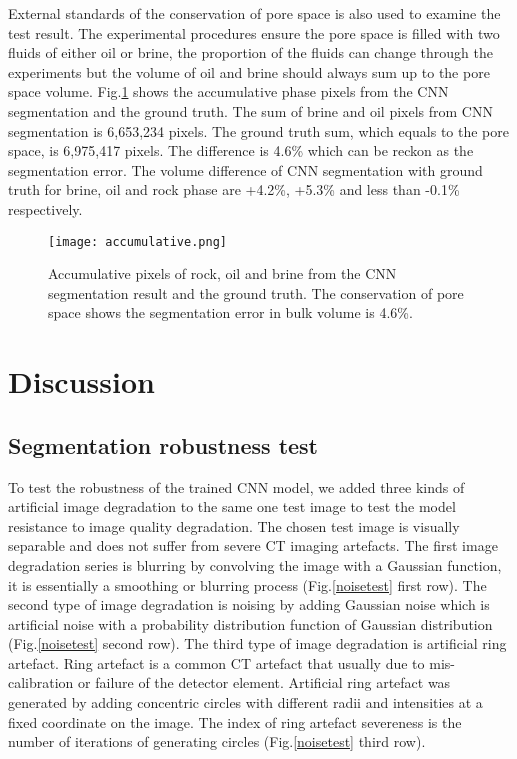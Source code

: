 \documentclass[draft,linenumbers]{agujournal2018}
\begin{document}
External standards of the conservation of pore space is also used to examine the test result. The experimental procedures ensure the pore space is filled with two fluids of either oil or brine, the proportion of the fluids can change through the experiments but the volume of oil and brine should always sum up to the pore space volume. Fig.\ref{accumulative} shows the accumulative phase pixels from the CNN segmentation and the ground truth. The sum of brine and oil pixels from CNN segmentation is 6,653,234 pixels. The ground truth sum, which equals to the pore space, is 6,975,417 pixels. The difference is 4.6\% which can be reckon as the segmentation error. The volume difference of CNN segmentation with ground truth for brine, oil and rock phase are +4.2\%, +5.3\% and less than -0.1\% respectively. 

\begin{figure}[h]
 \centering
 \texttt{[image: accumulative.png]}
 \caption{Accumulative pixels of rock, oil and brine from the CNN segmentation result and the ground truth. The conservation of pore space shows the segmentation error in bulk volume is 4.6\%.}
 \label{accumulative}
 \end{figure}

\section{Discussion}
\subsection{Segmentation robustness test}
To test the robustness of the trained CNN model, we added three kinds of artificial image degradation to the same one test image to test the model resistance to image quality degradation. The chosen test image is visually separable and does not suffer from severe CT imaging artefacts. The first image degradation series is blurring by convolving the image with a Gaussian function, it is essentially a smoothing or blurring process (Fig.\ref{noisetest} first row). The second type of image degradation is noising by adding Gaussian noise which is artificial noise with a probability distribution function of Gaussian distribution (Fig.\ref{noisetest} second row). The third type of image degradation is artificial ring artefact. Ring artefact is a common CT artefact that usually due to mis-calibration or failure of the detector element. Artificial ring artefact was generated by adding concentric circles with different radii and intensities at a fixed coordinate on the image. The index of ring artefact severeness is the number of iterations of generating circles (Fig.\ref{noisetest} third row).
\end{document}
